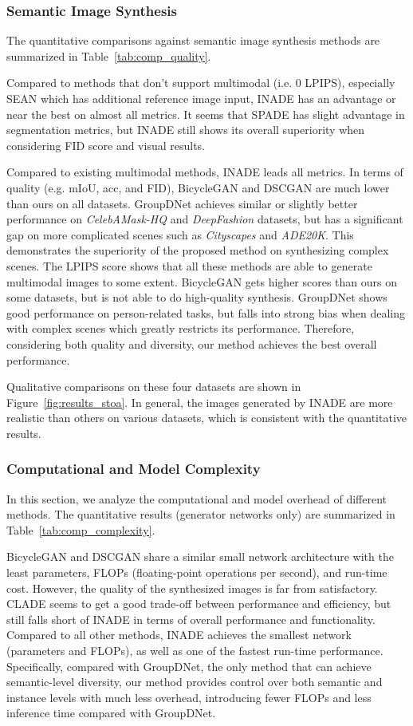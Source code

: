 \documentclass[final]{cvpr}
\begin{document}
\subsubsection{Semantic Image Synthesis}
The quantitative comparisons against semantic image synthesis methods are summarized in Table~\ref{tab:comp_quality}.

Compared to methods that don't support multimodal (i.e. 0 LPIPS), especially SEAN which has additional reference image input, INADE has an advantage or near the best on almost all metrics. It seems that SPADE has slight advantage in segmentation metrics, but INADE still shows its overall superiority when considering FID score and visual results.

Compared to existing multimodal methods, INADE leads all metrics. In terms of quality (e.g. mIoU, acc, and FID), BicycleGAN and DSCGAN are much lower than ours on all datasets. GroupDNet achieves similar or slightly better performance on \textit{CelebAMask-HQ} and \textit{DeepFashion} datasets, but has a significant gap on more complicated scenes such as \textit{Cityscapes} and \textit{ADE20K}. This demonstrates the superiority of the proposed method on synthesizing complex scenes. The LPIPS score shows that all these methods are able to generate multimodal images to some extent. 
BicycleGAN gets higher scores than ours on some datasets, but is not able to do high-quality synthesis.
GroupDNet shows good performance on person-related tasks, but falls into strong bias when dealing with complex scenes which greatly restricts its performance. Therefore, considering both quality and diversity, our method achieves the best overall performance.

Qualitative comparisons on these four datasets are shown in Figure~\ref{fig:results_stoa}. In general, the images generated by INADE are more realistic than others on various datasets, which is consistent with the quantitative results.

\subsubsection{Computational and Model Complexity}
In this section, we analyze the computational and model overhead of different methods. The quantitative results (generator networks only) are summarized in Table~\ref{tab:comp_complexity}.

BicycleGAN and DSCGAN share a similar small network architecture with the least parameters, FLOPs (floating-point operations per second), and run-time cost. However, the quality of the synthesized images is far from satisfactory. CLADE seems to get a good trade-off between performance and efficiency, but still falls short of INADE in terms of overall performance and functionality.
Compared to all other methods, INADE achieves the smallest network (parameters and FLOPs), as well as one of the fastest run-time performance.
Specifically, compared with GroupDNet, the only method that can achieve semantic-level diversity, our method provides control over both semantic and instance levels with much less overhead, introducing  fewer FLOPs and  less inference time compared with GroupDNet.
\end{document}
